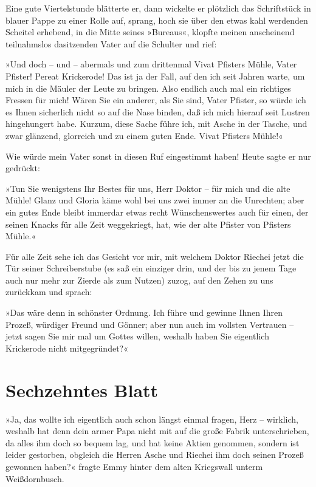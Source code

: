 Eine gute Viertelstunde blätterte er, dann wickelte er plötzlich
das Schriftstück in blauer Pappe zu einer Rolle auf, sprang, hoch
sie über den etwas kahl werdenden Scheitel erhebend, in die Mitte
seines »Bureaus«, klopfte meinen anscheinend teilnahmslos
dasitzenden Vater auf die Schulter und rief:

»Und doch – und – abermals und zum drittenmal Vivat Pfisters Mühle,
Vater Pfister! Pereat Krickerode! Das ist ja der Fall, auf den ich
seit Jahren warte, um mich in die Mäuler der Leute zu bringen. Also
endlich auch mal ein richtiges Fressen für mich! Wären Sie ein
anderer, als Sie sind, Vater Pfister, so würde ich es Ihnen
sicherlich nicht so auf die Nase binden, daß ich mich hierauf seit
Lustren hingehungert habe. Kurzum, diese Sache führe ich, mit Asche
in der Tasche, und zwar glänzend, glorreich und zu einem guten
Ende. Vivat Pfisters Mühle!«

Wie würde mein Vater sonst in diesen Ruf eingestimmt haben! Heute
sagte er nur gedrückt:

»Tun Sie wenigstens Ihr Bestes für uns, Herr Doktor – für mich und
die alte Mühle! Glanz und Gloria käme wohl bei uns zwei immer an
die Unrechten; aber ein gutes Ende bleibt immerdar etwas recht
Wünschenswertes auch für einen, der seinen Knacks für alle Zeit
weggekriegt, hat, wie der alte Pfister von Pfisters Mühle.«

Für alle Zeit sehe ich das Gesicht vor mir, mit welchem Doktor
Riechei jetzt die Tür seiner Schreiberstube (es saß ein einziger
drin, und der bis zu jenem Tage auch nur mehr zur Zierde als zum
Nutzen) zuzog, auf den Zehen zu uns zurückkam und sprach:

»Das wäre denn in schönster Ordnung. Ich führe und gewinne Ihnen
Ihren Prozeß, würdiger Freund und Gönner; aber nun auch im vollsten
Vertrauen – jetzt sagen Sie mir mal um Gottes willen, weshalb haben
Sie eigentlich Krickerode nicht mitgegründet?«

\section{Sechzehntes Blatt}

»Ja, das wollte ich eigentlich auch schon längst einmal fragen,
Herz – wirklich, weshalb hat denn dein armer Papa nicht mit auf die
große Fabrik unterschrieben, da alles ihm doch so bequem lag, und
hat keine Aktien genommen, sondern ist leider gestorben, obgleich
die Herren Asche und Riechei ihm doch seinen Prozeß gewonnen
haben?« fragte Emmy hinter dem alten Kriegswall unterm
Weißdornbusch.

